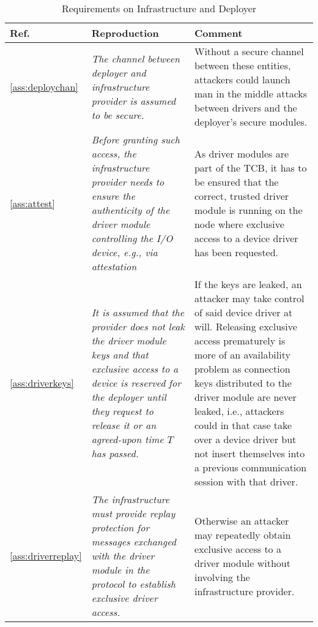 \begin{longtable}{|p{}|p{}|p{}|}
\caption{Requirements on Infrastructure and Deployer}\\
\hline
Ref. & Reproduction & Comment \\
\hline
\hline

\ref{ass:deploychan} & 
\em The channel between deployer and infrastructure provider is assumed to be secure. &
Without a secure channel between these entities, attackers could launch man in the middle attacks between drivers and the deployer's secure modules. \\
\hline

\ref{ass:attest} & 
\em Before granting such access, the infrastructure provider needs to ensure the authenticity of the driver module controlling the I/O device, e.g., via attestation &
As driver modules are part of the TCB, it has to be ensured that the correct, trusted driver module is running on the node where exclusive access to a device driver has been requested. \\
\hline

\ref{ass:driverkeys} & 
\em It is assumed that the provider does not leak the driver module keys and that exclusive access to a device is reserved for the deployer until they request to release it or an agreed-upon time $T$ has passed. & 
If the keys are leaked, an attacker may take control of said device driver at will. Releasing exclusive access prematurely is more of an availability problem as connection keys distributed to the driver module are never leaked, i.e., attackers could in that case take over a device driver but not insert themselves into a previous communication session with that driver.\\
\hline

\ref{ass:driverreplay} & 
\em The infrastructure must provide replay protection for messages exchanged with the driver module in the protocol to establish exclusive driver access. &
Otherwise an attacker may repeatedly obtain exclusive access to a driver module without involving the infrastructure provider.\\
\hline

\end{longtable}

